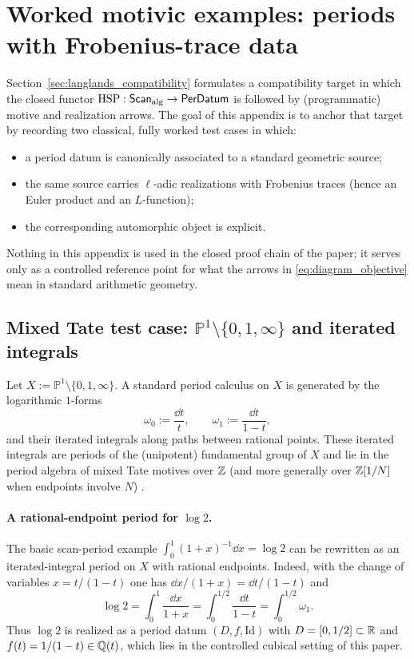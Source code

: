 \section{Worked motivic examples: periods with Frobenius-trace data}
\label{app:motivic_worked_examples}

Section~\ref{sec:langlands_compatibility} formulates a compatibility target in which the closed functor $\mathrm{HSP}:\mathsf{Scan}_{\mathrm{alg}}\to\mathsf{PerDatum}$ is followed by (programmatic) motive and realization arrows. The goal of this appendix is to anchor that target by recording two classical, fully worked test cases in which:
\begin{itemize}
\item a period datum is canonically associated to a standard geometric source;
\item the same source carries $\ell$-adic realizations with Frobenius traces (hence an Euler product and an $L$-function);
\item the corresponding automorphic object is explicit.
\end{itemize}
Nothing in this appendix is used in the closed proof chain of the paper; it serves only as a controlled reference point for what the arrows in \eqref{eq:diagram_objective} mean in standard arithmetic geometry.

\subsection{Mixed Tate test case: \texorpdfstring{$\mathbb{P}^1\setminus\{0,1,\infty\}$}{P1 minus 0,1,infty} and iterated integrals}
\label{app:mixed_tate_test_case}

Let $X:=\mathbb{P}^1\setminus\{0,1,\infty\}$. A standard period calculus on $X$ is generated by the logarithmic $1$-forms
\[
\omega_0:=\frac{\dd t}{t},
\qquad
\omega_1:=\frac{\dd t}{1-t},
\]
and their iterated integrals along paths between rational points. These iterated integrals are periods of the (unipotent) fundamental group of $X$ and lie in the period algebra of mixed Tate motives over $\mathbb{Z}$ (and more generally over $\mathbb{Z}[1/N]$ when endpoints involve $N$) \cite{KontsevichZagier2001,Brown2012,DeligneGoncharov2005}.

\paragraph{A rational-endpoint period for $\log 2$.}
The basic scan-period example $\int_0^1 (1+x)^{-1}\dd x=\log 2$ can be rewritten as an iterated-integral period on $X$ with rational endpoints. Indeed, with the change of variables $x=t/(1-t)$ one has $\dd x/(1+x)=\dd t/(1-t)$ and
\begin{equation}
\label{eq:log2_iterated_integral}
\log 2
=\int_0^1 \frac{\dd x}{1+x}
=\int_0^{1/2}\frac{\dd t}{1-t}
=\int_{0}^{1/2}\omega_1.
\end{equation}
Thus $\log 2$ is realized as a period datum $(D,f,\mathrm{Id})$ with $D=[0,1/2]\subset\mathbb{R}$ and $f(t)=1/(1-t)\in\mathbb{Q}(t)$, which lies in the controlled cubical setting of this paper.

